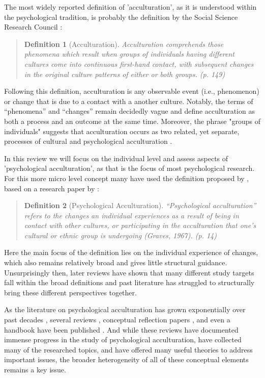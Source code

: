 \documentclass[man, 12pt, a4paper]{apa7}
\newtheorem{definition}{Definition}
\begin{document}
The most widely reported definition of 'acculturation', as it is understood within the psychological tradition, is probably the definition by the Social Science Research Council \citep[][]{Redfield1936}:
\begin{quote}
    \begin{definition}[Acculturation]
        Acculturation comprehends those phenomena which result when groups of individuals having different cultures come into continuous first-hand contact, with subsequent changes in the original culture patterns of either or both groups. (p. 149)
    \end{definition}  
\end{quote}
Following this definition, acculturation is any observable event (i.e., phenomenon) or change that is due to a contact with a another culture. Notably, the terms of “phenomena” and “changes” remain decidedly vague and define acculturation as both a process and an outcome at the same time. Moreover, the phrase "groups of individuals" suggests that acculturation occurs as two related, yet separate, processes of cultural and psychological acculturation \citep[also see,][]{Sam2006b, Berry2005}.

In this review we will focus on the individual level and assess aspects of 'psychological acculturation', as that is the focus of most psychological research. For this more micro level concept many have used the definition proposed by \citet[][]{Sam2006b}, based on a research paper by \citet{Graves1967}: 
\begin{quote}
    \begin{definition}[Psychological Acculturation]
        “Psychological acculturation” refers to the changes an individual experiences as a result of being in contact with other cultures, or participating in the acculturation that one’s cultural or ethnic group is undergoing (Graves, 1967). (p. 14)
    \end{definition}
\end{quote}
Here the main focus of the definition lies on the individual experience of changes, which also remains relatively broad and gives little structural guidance. Unsurprisingly then, later reviews have shown that many different study targets fall within the broad definitions and past literature has struggled to structurally bring these different perspectives together.

As the literature on psychological acculturation has grown exponentially over past decades \citep{Rudmin2003a}, several reviews \citep[e.g.,][]{DeLeersnyder2017, Matsudaira2006, Celenk2011}, conceptual reflection papers \citep[e.g.,][]{Ward2012, Berry1997b}, and even a handbook have been published \citep{Sam2006a}. And while these reviews have documented immense progress in the study of psychological acculturation, have collected many of the researched topics, and have offered many useful theories to address important issues, the broader heterogeneity of all of these conceptual elements remains a key issue.
\end{document}
